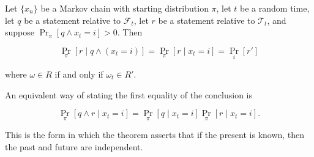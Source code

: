 Let $\{x_n\}$ be a Markov chain with starting distribution $\pi$, let $t$ be a random time, let $q$ be a statement relative to $\mathcal{F}_t$, let $r$ be a statement relative to $\mathcal{T}_t$, and suppose $\Pr_\pi[q \land x_t = i] > 0$. Then

$$\Pr_\pi[r \mid q \land (x_t = i)] = \Pr_\pi[r \mid x_t = i] = \Pr_i[r']$$

where $\omega \in R$ if and only if $\omega_t \in R'$.

An equivalent way of stating the first equality of the conclusion is

$$\Pr_{\pi}[q \land r \mid x_t = i] = \Pr_{\pi}[q \mid x_t = i] \Pr_{\pi}[r \mid x_t = i].$$

This is the form in which the theorem asserts that if the present is known, then the past and future are independent.
